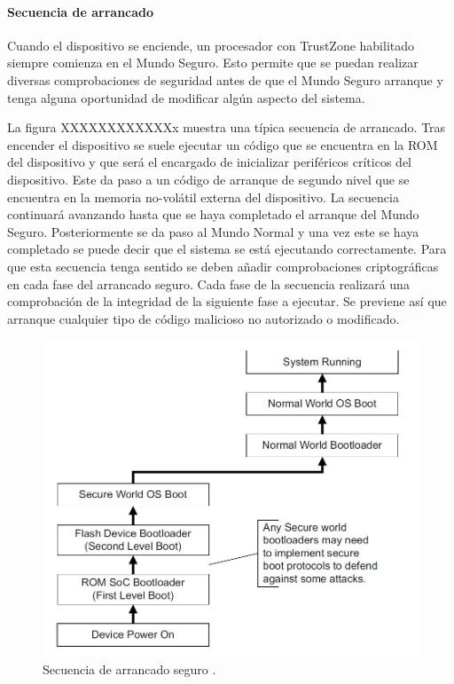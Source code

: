 \paragraph{Secuencia de arrancado}
Cuando el dispositivo se enciende, un procesador con TrustZone habilitado siempre comienza en el Mundo Seguro. Esto permite que se puedan realizar diversas comprobaciones de seguridad antes de que el Mundo Seguro arranque y tenga alguna oportunidad de modificar algún aspecto del sistema.\newline

La figura XXXXXXXXXXXXx muestra una típica secuencia de arrancado. Tras encender el dispositivo se suele ejecutar un código que se encuentra en la ROM del dispositivo y que será el encargado de inicializar periféricos críticos del dispositivo. Este da paso a un código de arranque de segundo nivel que se encuentra en la memoria no-volátil externa del dispositivo. La secuencia continuará avanzando hasta que se haya completado el arranque del Mundo Seguro. Posteriormente se da paso al Mundo Normal y una vez este se haya completado se puede decir que el sistema se está ejecutando correctamente.
Para que esta secuencia tenga sentido se deben añadir comprobaciones criptográficas en cada fase del arrancado seguro. Cada fase de la secuencia realizará una comprobación de la integridad de la siguiente fase a ejecutar. Se previene así que arranque cualquier tipo de código malicioso no autorizado o modificado. \newline

\begin{figure}
	\centering
	\includegraphics[width=1\textwidth]{imagenes/secureboot.jpg}
	\caption{\label{fig1}Secuencia de arrancado seguro \cite{trustzone}.}
\end{figure}

